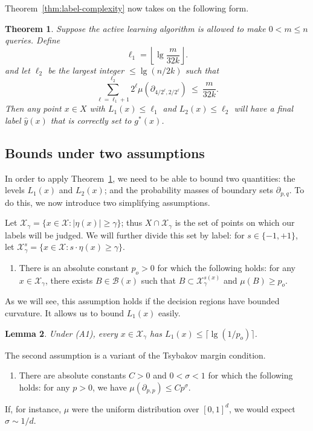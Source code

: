 \documentclass{article}
\def\X{{\mathcal X}}
\def\B{{\mathcal B}}
\def\yh{{\widehat{y}}}
\newtheorem{thm}{Theorem}
\newtheorem{lemma}[thm]{Lemma}
\begin{document}
Theorem~\ref{thm:label-complexity} now takes on the following form. 
\begin{thm}
Suppose the active learning algorithm is allowed to make $0 < m \leq n$ queries. Define
$$ \ell_1 = \left\lfloor \lg \frac{m}{32k} \right\rfloor .$$
and let $\ell_2$ be the largest integer $\leq \lg (n/2k)$ such that
$$ \sum_{\ell = \ell_1 + 1}^{\ell_2} 2^\ell \mu(\partial_{4/2^\ell, 2/2^\ell}) \ \leq \ \frac{m}{32k} .$$
Then any point $x \in X$ with $L_1(x) \leq \ell_1$ and $L_2(x) \leq \ell_2$ will have a final label $\yh(x)$ that is correctly set to $g^*(x)$.
\label{thm:label-complexity-dist}
\end{thm}



\subsection{Bounds under two assumptions}

In order to apply Theorem~\ref{thm:label-complexity-dist}, we need to be able to bound two quantities: the levels $L_1(x)$ and $L_2(x)$; and the probability masses of boundary sets $\partial_{p,q}$. To do this, we now introduce two simplifying assumptions.

 Let $\X_\gamma = \{x \in \X: |\eta(x)| \geq \gamma\}$; thus $X \cap \X_\gamma$ is the set of points on which our labels will be judged. We will further divide this set by label: for $s \in \{-1,+1\}$, let $\X^s_\gamma = \{x \in \X: s \cdot \eta(x) \geq \gamma\}$. 
\begin{enumerate}
\item[(A1)] There is an absolute constant $p_o > 0$ for which the following holds: for any $x \in \X_\gamma$, there exists $B \in \B(x)$ such that $B \subset \X^{s(x)}_\gamma$ and $\mu(B) \geq p_o$.
\end{enumerate}
As we will see, this assumption holds if the decision regions have bounded curvature. It allows us to bound $L_1(x)$ easily.
\begin{lemma}
Under (A1), every $x \in \X_\gamma$ has $L_1(x) \leq \lceil \lg (1/p_o) \rceil$.
\label{lemma:L1-bound}
\end{lemma} 
The second assumption is a variant of the Tsybakov margin condition.
\begin{enumerate}
\item[(A2)] There are absolute constants $C > 0$ and $0 < \sigma < 1$ for which the following holds: for any $p > 0$, we have $\mu(\partial_{p,p}) \leq C p^\sigma$.
\end{enumerate}
If, for instance, $\mu$ were the uniform distribution over $[0,1]^d$, we would expect $\sigma \sim 1/d$.
\end{document}
